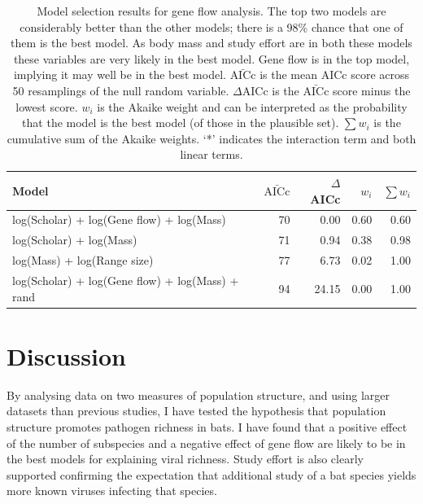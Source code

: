 \begin{table}[t]
\caption[Model selection results for gene flow analysis]{
Model selection results for gene flow analysis. 
The top two models are considerably better than the other models; there is a 98\% chance that one of them is the best model.
As body mass and study effort are in both these models these variables are very likely in the best model.
Gene flow is in the top model, implying it may well be in the best model.
$\bar{\text{AICc}}$ is the mean AICc score across 50 resamplings of the null random variable. 
$\Delta$AICc is the $\bar{\text{AICc}}$ score minus the lowest score. 
$w_i$ is the Akaike weight and can be interpreted as the probability that the model is the best model (of those in the plausible set).
$\sum w_i$ is the cumulative sum of the Akaike weights.
`*' indicates the interaction term and both linear terms.
}
\begin{tabular}{@{}>{\small}lrrrr@{}}
\toprule
\normalsize{Model} & $\bar{\text{AICc}}$ & $\Delta$AICc & $w_i$ & $\sum w_i$\\
\midrule
log(Scholar) + log(Gene flow) + log(Mass) & 
70 & 0.00 &
0.60 & 0.60\\
log(Scholar) + log(Mass) & 
71 & 0.94 &
0.38 & 0.98\\
log(Mass) + log(Range size) & 
77 & 6.73 &
0.02 & 1.00\\
log(Scholar) + log(Gene flow) + log(Mass) + rand &
94 & 24.15 &
0.00 & 1.00\\
\bottomrule
\end{tabular}

\label{t:fstmodels}
\end{table}





\clearpage
\section{Discussion}  



By analysing data on two measures of population structure, and using larger datasets than previous studies, I have tested the hypothesis that population structure promotes pathogen richness in bats.
I have found that a positive effect of the number of subspecies and a negative effect of gene flow are likely to be in the best models for explaining viral richness.
Study effort is also clearly supported confirming the expectation that additional study of a bat species yields more known viruses infecting that species.




